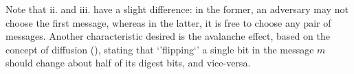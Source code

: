\documentclass{article}
\begin{document}
Note that ii. and iii. have a slight difference: in the former, an adversary
may not choose the first message, whereas in the latter, it is free to choose
any pair of messages. Another characteristic desired is the avalanche effect,
based on the concept of diffusion (\cite{Stallings:2010:CNS:1824151}), stating
that `'flipping`' a single bit in the message $m$ should change about half of
its digest bits, and vice-versa.



\end{document}
